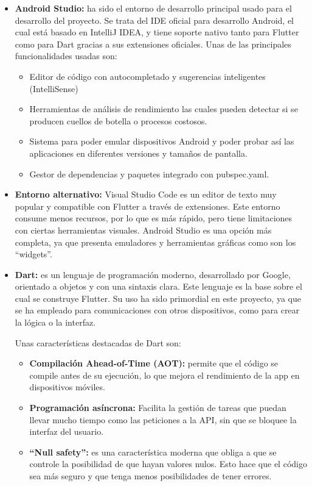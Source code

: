 \begin{itemize}
    \item \textbf{Android Studio:} ha sido el entorno de desarrollo principal usado para el desarrollo del proyecto. Se trata del IDE oficial para desarrollo Android, el cual está basado en IntelliJ IDEA, y tiene soporte nativo tanto para Flutter como para Dart gracias a sus extensiones oficiales.
    Unas de las principales funcionalidades usadas son:
    \begin{itemize}
        \item {Editor de código con autocompletado y sugerencias inteligentes (IntelliSense)}
        \item {Herramientas de análisis de rendimiento las cuales pueden detectar si se producen cuellos de botella o procesos costosos.}
        \item {Sistema para poder emular dispositivos Android y poder probar así las aplicaciones en diferentes versiones y tamaños de pantalla.}
        \item  {Gestor de dependencias y paquetes integrado con pubspec.yaml.}
    \end{itemize}
    \item \textbf{Entorno alternativo:} Visual Studio Code es un editor de texto muy popular y compatible con Flutter a través de extensiones. Este entorno consume menos recursos, por lo que es más rápido, pero tiene limitaciones con ciertas herramientas visuales. Android Studio es una opción más completa, ya que presenta emuladores y herramientas gráficas como son los ``widgets''.


    \item \textbf{Dart:} es un lenguaje de programación moderno, desarrollado por Google, orientado a objetos y con una sintaxis clara. Este lenguaje es la base sobre el cual se construye Flutter. Su uso ha sido primordial en este proyecto, ya que se ha empleado para comunicaciones con otros dispositivos, como para crear la lógica o la interfaz.
    
    Unas características destacadas de Dart son:
    \begin{itemize}
        \item \textbf{Compilación Ahead-of-Time (AOT):} permite que el código se compile antes de su ejecución, lo que mejora el rendimiento de la app en dispositivos móviles.
        \item \textbf{Programación asíncrona:} Facilita la gestión de tareas que puedan llevar mucho tiempo como las peticiones a la API, sin que se bloquee la interfaz del usuario.
        \item \textbf{``Null safety'':} es una característica moderna que obliga a que se controle la posibilidad de que hayan valores nulos. Esto hace que el código sea más seguro y que tenga menos posibilidades de tener errores. 
    \end{itemize}


\end{itemize}
